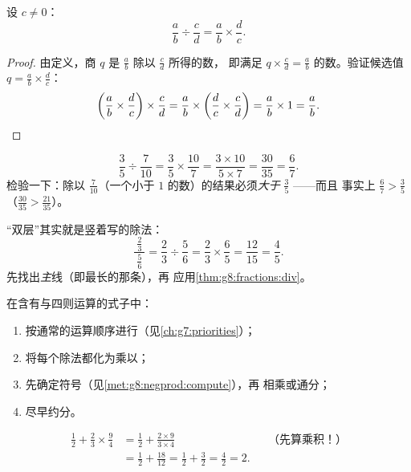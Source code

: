 \begin{theorem}[除法即乘以倒数]\label{thm:g8:fractions:div}
设 $c \neq 0$：
\[
\frac{a}{b} \div \frac{c}{d} = \frac{a}{b} \times \frac{d}{c} .
\]
\end{theorem}

\begin{proof}
由定义，商 $q$ 是 $\frac ab$ 除以 $\frac cd$ 所得的数，
即满足 $q \times \frac cd = \frac ab$ 的数。验证候选值
$q = \frac ab \times \frac dc$：
\[
\left(\frac ab \times \frac dc\right) \times \frac cd
= \frac ab \times \left(\frac dc \times \frac cd\right)
= \frac ab \times 1 = \frac ab . \qedhere
\]
\end{proof}

\begin{example}\label{ex:g8:fractions:div}
\[
\frac{3}{5} \div \frac{7}{10}
= \frac{3}{5} \times \frac{10}{7}
= \frac{3 \times 10}{5 \times 7}
= \frac{30}{35} = \frac{6}{7}.
\]
检验一下：除以 $\frac{7}{10}$（一个小于
$1$ 的数）的结果必须\emph{大于} $\frac35$ ——而且
事实上 $\frac67 > \frac35$（$\frac{30}{35} > \frac{21}{35}$）。
\end{example}

\begin{example}[分数线中的分数线]\label{ex:g8:fractions:complex}
“双层”其实就是竖着写的除法：
\[
\frac{\ \frac{2}{3}\ }{\ \frac{5}{6}\ }
= \frac{2}{3} \div \frac{5}{6}
= \frac{2}{3} \times \frac{6}{5}
= \frac{12}{15} = \frac{4}{5}.
\]
先找出\emph{主}线（即最长的那条），再
应用\cref{thm:g8:fractions:div}。
\end{example}

\begin{method}[混合运算]\label{met:g8:fractions:mixed}
在含有与四则运算的式子中：
\begin{enumerate}
  \item 按通常的运算顺序进行（见\cref{ch:g7:priorities}）；
  \item 将每个除法都化为乘以；
  \item 先确定符号（见\cref{met:g8:negprod:compute}），再
        相乘或通分；
  \item 尽早约分。
\end{enumerate}
\end{method}

\begin{example}\label{ex:g8:fractions:mixed}
\begin{align*}
\frac12 + \frac{2}{3} \times \frac{9}{4}
&= \frac12 + \frac{2 \times 9}{3 \times 4}
&& \text{（先算乘积！）} \\
&= \frac12 + \frac{18}{12} = \frac12 + \frac32
= \frac{4}{2} = 2 .
\end{align*}
\end{example}

